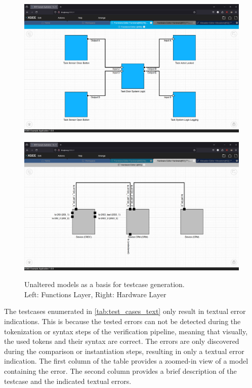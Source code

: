 \begin{figure}[htb]  \centering
    \begin{minipage}{0.4\textwidth}
        \centering
        \includegraphics[width=\textwidth]{pictures/functions_unaltered.png}
        \label{fig:functions_unaltered}
    \end{minipage}
    \hfill
    \begin{minipage}{0.4\textwidth}
        \centering
        \includegraphics[width=\textwidth]{pictures/hardware_unaltered.png}
        \label{fig:hardware_unaltered}
    \end{minipage}
    \caption[Unaltered models as a basis for testcase generation]{Unaltered models as a basis for testcase generation.\\
    Left: Functions Layer, Right: Hardware Layer}
    \label{fig:unaltered_layers}
\end{figure}
The testcases enumerated in \autoref{tab:test_cases_text} only result in textual error indications. This is because the tested errors can not be detected during the tokenization or syntax steps of the verification pipeline, meaning that visually, the used tokens and their syntax are correct. The errors are only discovered during the comparison or instantiation steps, resulting in only a textual error indication. The first column of the table provides a zoomed-in view of a model containing the error. The second column provides a brief description of the testcase and the indicated textual errors.

